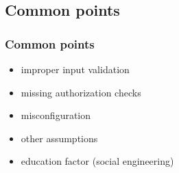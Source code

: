 \subsection{Common points}

\begin{frame}
\frametitle{Common points}
\begin{itemize}
\item improper input validation
\item missing authorization checks
\item misconfiguration
\item other assumptions
\item education factor \small{(social engineering)}
\end{itemize}
\end{frame}

